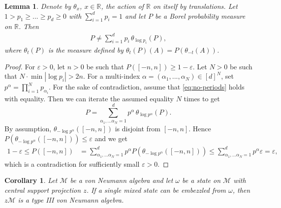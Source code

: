 \documentclass[a4paper, 10pt, onecolumn, accepted=2025-07-22]{quantumarticle}
\newtheorem{lemma}[theorem]{Lemma}
\newtheorem{corollary}[theorem]{Corollary}
\theoremstyle{definition}
\newcommand{\mc}{\mathcal}
\newcommand{\eps}{\varepsilon}
\def\M{{\mc M}}
\def\RR{{\mathbb R}}
\newcommand*{\1}{\text{\usefont{U}{bbold}{m}{n}1}}
\begin{document}
\begin{lemma}\label{lem:no-periods}
    Denote by $\theta_x$, $x\in\RR$, the action of $\RR$ on itself by translations.
    Let $1> p_1\ge ... \ge p_d \ge 0$ with $\sum_{i=1}^d p_i = 1$ and let $P$ be a Borel probability measure on $\RR$. Then
    \begin{align}\label{eq:no-periods}
        P \neq \sum_{i=1}^d p_i\, \theta_{\log p_i}(P),
    \end{align}
    where $\theta_t(P)$ is the measure defined by $\theta_t(P)(A) = P(\theta_{-t}(A))$.
\end{lemma}
\begin{proof}
    For $\eps>0$, let $n>0$ be such that $P([-n,n])\ge 1-\eps$.
    Let $N>0$ be such that $N \cdot \min |\log p_i| > 2n$.
    For a multi-index $\alpha=(\alpha_1,...,\alpha_{N}) \in [d]^N$, set $p^\alpha = \prod_{i=1}^{N} p_{\alpha_i}$.
    For the sake of contradiction, assume that \eqref{eq:no-periods} holds with equality. Then we can iterate the assumed equality $N$ times to get
    \begin{equation*}
        P = \sum_{\alpha_1,\ldots\alpha_N=1}^d p^\alpha  \, \theta_{\log p^\alpha}(P).
    \end{equation*}
    By assumption, $\theta_{-\log p^{\alpha}}([-n,n])$ is disjoint from $[-n,n]$.
    Hence $P(\theta_{-\log p^\alpha}([-n,n]))\le\eps$ and we get
    \begin{align*}
        1-\eps \le P([-n,n]) &= \sum_{\alpha_1,\ldots\alpha_N=1}^d p^\alpha P(\theta_{-\log p^\alpha}([-n,n])) 
        \le \sum_{\alpha_1,\ldots\alpha_N=1}^d p^\alpha \eps =\eps,
    \end{align*}
    which is a contradiction for sufficiently small $\eps>0$.
\end{proof}
\begin{corollary}\label{cor:typeIII}
    Let $\M$ be  a von Neumann algebra and let $\omega$ be a state on $\M$ with central support projection $z$.
    If a single mixed state can be embezzled from $\omega$, then $z\M$ is a type III von Neumann algebra.
\end{corollary}
\end{document}
